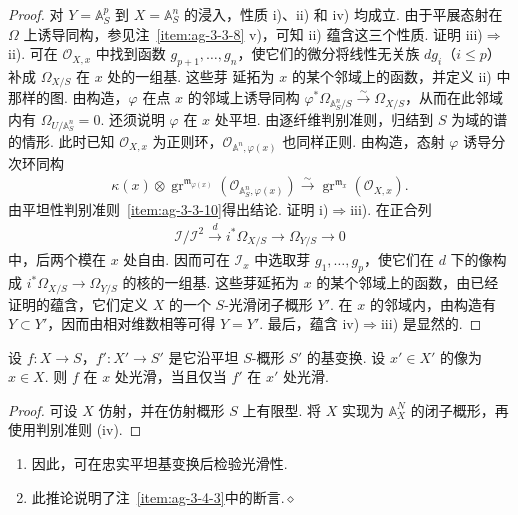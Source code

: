\begin{proof}
对 $Y=\mathbb A_S^p$ 到 $X=\mathbb A_S^n$ 的浸入，性质 i)、ii) 和 iv) 均成立. 由于平展态射在 $\Omega$ 上诱导同构，参见注~\ref{item:ag-3-3-8} v)，可知 ii) 蕴含这三个性质.
证明 iii)$\Rightarrow$ii). 可在 $\mathcal O_{X,x}$ 中找到函数 $g_{p+1},\ldots,g_n$，使它们的微分将线性无关族 $dg_i$（$i\le p$）补成 $\Omega_{X/S}$ 在 $x$ 处的一组基. 这些芽
延拓为 $x$ 的某个邻域上的函数，并定义 ii) 中那样的图. 由构造，$\varphi$ 在点 $x$ 的邻域上诱导同构 $\varphi^*\Omega_{\mathbb A_S^n/S}\xrightarrow\sim\Omega_{X/S}$，从而在此邻域内有 $\Omega_{U/\mathbb A_S^n}=0$. 还须说明 $\varphi$ 在 $x$ 处平坦. 由逐纤维判别准则，归结到 $S$ 为域的谱的情形. 此时已知 $\mathcal O_{X,x}$ 为正则环，$\mathcal O_{\mathbb A^n,\varphi(x)}$ 也同样正则. 由构造，态射 $\varphi$ 诱导分次环同构
\begin{align*}
\kappa(x)\otimes\operatorname{gr}^{\mathfrak m_{\varphi(x)}}(\mathcal O_{\mathbb A_S^n,\varphi(x)})\xrightarrow\sim\operatorname{gr}^{\mathfrak m_x}(\mathcal O_{X,x}).
\end{align*}
由平坦性判别准则~\ref{item:ag-3-3-10}得出结论.
证明 i)$\Rightarrow$iii). 在正合列
\begin{align*}
\mathcal I/\mathcal I^2\xrightarrow d i^*\Omega_{X/S}\longrightarrow\Omega_{Y/S}\longrightarrow0
\end{align*}
中，后两个模在 $x$ 处自由. 因而可在 $\mathcal I_x$ 中选取芽 $g_1,\ldots,g_p$，使它们在 $d$ 下的像构成 $i^*\Omega_{X/S}\longrightarrow\Omega_{Y/S}$ 的核的一组基. 这些芽延拓为 $x$ 的某个邻域上的函数，由已经证明的蕴含，它们定义 $X$ 的一个 $S$-光滑闭子概形 $Y'$. 在 $x$ 的邻域内，由构造有 $Y\subset Y'$，因而由相对维数相等可得 $Y=Y'$.
最后，蕴含 iv)$\Rightarrow$iii) 是显然的.
\end{proof}
\begin{corollary}\label{item:ag-3-4-10}
设 $f:X\longrightarrow S$，$f':X'\longrightarrow S'$ 是它沿平坦 $S$-概形 $S'$ 的基变换. 设 $x'\in X'$ 的像为 $x\in X$. 则 $f$ 在 $x$ 处光滑，当且仅当 $f'$ 在 $x'$ 处光滑.
\end{corollary}
\begin{proof}
可设 $X$ 仿射，并在仿射概形 $S$ 上有限型. 将 $X$ 实现为 $\mathbb A_X^N$ 的闭子概形，再使用判别准则 (iv).
\end{proof}
\begin{remark}\label{item:ag-3-4-11}
\begin{enumerate}[label=(\roman*)]
\item 因此，可在忠实平坦基变换后检验光滑性.
\item 此推论说明了注~\ref{item:ag-3-4-3}中的断言.\unskip\nobreak\hfill\ensuremath{\diamond}
\end{enumerate}
\renewcommand{\envenddiamond}{}
\end{remark}
